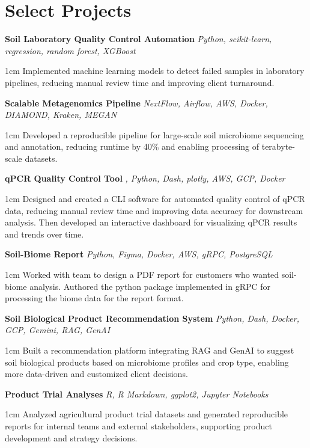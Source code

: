 \section*{Select Projects}

\newcommand{\Project}[3]{%
  \noindent\textbf{#1} \hfill \textit{#2}\\
  \begin{addmargin}[1cm]{1cm}
    #3
  \end{addmargin}
  \vspace{0.2cm}
}

\Project
  {Soil Laboratory Quality Control Automation}
  {Python, scikit-learn, regression, random forest, XGBoost}
  {Implemented machine learning models to detect failed samples in laboratory pipelines, reducing manual review time and improving client turnaround.}

\Project
  {Scalable Metagenomics Pipeline}
  {NextFlow, Airflow, AWS, Docker, DIAMOND, Kraken, MEGAN}
  {Developed a reproducible pipeline for large-scale soil microbiome sequencing and annotation, reducing runtime by 40\% and enabling processing of terabyte-scale datasets.}

\Project
  {qPCR Quality Control Tool}
  {\CC, Python, Dash, plotly, AWS, GCP, Docker}
  {Designed and created a CLI \CC software for automated quality control of qPCR data, reducing manual review time and improving data accuracy for downstream analysis. Then developed an interactive dashboard for visualizing qPCR results and trends over time.}

\Project
  {Soil-Biome Report}
  {Python, Figma, Docker, AWS, gRPC, PostgreSQL}
  {Worked with team to design a PDF report for customers who wanted soil-biome analysis. Authored the python package implemented in gRPC for processing the biome data for the report format.}

\Project
  {Soil Biological Product Recommendation System}
  {Python, Dash, Docker, GCP, Gemini, RAG, GenAI}
  {Built a recommendation platform integrating RAG and GenAI to suggest soil biological products based on microbiome profiles and crop type, enabling more data-driven and customized client decisions.}

\Project
  {Product Trial Analyses}
  {R, R Markdown, ggplot2, Jupyter Notebooks}
  {Analyzed agricultural product trial datasets and generated reproducible reports for internal teams and external stakeholders, supporting product development and strategy decisions.}
